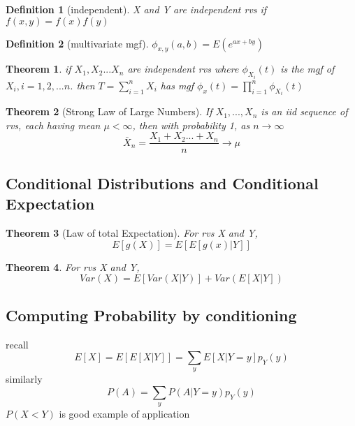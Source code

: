\documentclass[10pt]{article}
\theoremstyle{break}
\newtheorem{thm}{Theorem}[subsection]
\newtheorem{defn}{Definition}[subsection]
\begin{document}
        \begin{defn}[independent]
            X and Y are independent rvs if $f(x,y)=f(x)f(y)$
        \end{defn}
        \begin{defn}[multivariate mgf]
            $\phi_{x,y}(a,b)=E(e^{ax+by})$
        \end{defn}
        \begin{thm}
            if $X_1, X_2...X_n$ are independent rvs where $\phi_{X_i}(t)$ is the mgf of $X_i, i = 1,2,...n$.
            then $T=\sum^n_{i=1}X_i$ has mgf $\phi_x(t)=\prod_{i=1}^n\phi_{X_i}(t)$
        \end{thm}
        \begin{thm}[Strong Law of Large Numbers]
            If $X_1, ..., X_n$ is an iid sequence of rvs, each having mean $\mu < \infty$, then with probability 1, as $n\rightarrow \infty$ 
            $$\bar{X}_n=\frac{X_1+X_2 ... + X_n}{n}\rightarrow \mu$$              
        \end{thm}
    \subsection{Conditional Distributions and Conditional Expectation}
        \begin{thm}[Law of total Expectation]
            For rvs X and Y, 
            $$E[g(X)]=E[E[g(x)|Y]]$$
        \end{thm}
        \begin{thm}
            For rvs X and Y,
            $$Var(X)=E[Var(X|Y)]+Var(E[X|Y])$$
        \end{thm}
    \subsection{Computing Probability by conditioning}
        recall 
        $$E[X]=E[E[X|Y]]= \sum_y E[X|Y=y]p_Y(y)$$
        similarly 
        $$P(A)=\sum_yP(A|Y=y)p_Y(y)$$
        $P(X<Y)$ is good example of application
\end{document}
